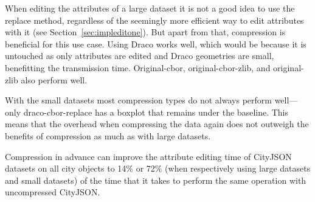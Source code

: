 When editing the attributes of a large dataset it is not a good idea to use the replace method, regardless of the seemingly more efficient way to edit attributes with it (see Section~\ref{sec:impleditone}).
But apart from that, compression is beneficial for this use case.
Using Draco works well, which would be because it is untouched as only attributes are edited and Draco geometries are small, benefitting the transmission time.
Original-cbor, original-cbor-zlib, and original-zlib also perform well.

With the small datasets most compression types do not always perform well---only draco-cbor-replace has a boxplot that remains under the baseline.
This means that the overhead when compressing the data again does not outweigh the benefits of compression as much as with large datasets.

Compression in advance can improve the attribute editing time of CityJSON datasets on all city objects to 14\% or 72\% (when respectively using large datasets and small datasets) of the time that it takes to perform the same operation with uncompressed CityJSON.


